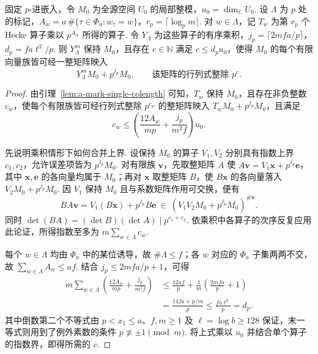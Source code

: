 \begin{lemma}
\label{lem:a-exceptional-hecke-colength}
\emitthmsource
固定 $p$-进嵌入，令 $M_0$ 为全源空间 $U_0$ 的局部整模，$u_0=\dim_{\mathbb C}U_0$. 设 $\Lambda$ 为 $p$ 处的标记，$A_w=a\,\#\{\tau\in\Phi_a:w_\tau=w\}$，$r_p=\lceil\log_p m\rceil$. 对 $w\in\Lambda$，记 $T_w$ 为第 $r_p$ 个 Hecke 算子乘以 $p^{A_w}$ 所得的算子. 令 $Y_\Lambda$ 为这些算子的有序乘积，$j_p=\lceil2mfa/p\rceil$，$d_p=fa\ell^2/p$. 则 $Y_\Lambda^m$ 保持 $M_0$，且存在 $c\in\mathbb N$ 满足 $c\le d_pu_0$，使得 $M_0$ 的每个有限向量族皆可经一整矩阵映入
\[
 Y_\Lambda^m M_0+p^{j_p}M_0,
 \qquad\text{该矩阵的行列式整除 }p^c.
\]
\end{lemma}
\begin{proof}
由引理~\ref{lem:a-mark-single-colength} 可知，$T_w$ 保持 $M_0$，且存在非负整数 $c_w$，使每个有限族皆可经行列式整除 $p^{c_w}$ 的整矩阵映入 $T_w M_0+p^{j_p}M_0$，且满足
\[
 c_w\le
  \left(\frac{12A_w}{mp}+\frac{j_p}{m^2f}\right)u_0 .
\]

先说明乘积情形下如何合并上界. 设保持 $M_0$ 的算子 $V_1,V_2$ 分别具有指数上界 $c_1,c_2$，允许误差项皆为 $p^{j_p}M_0$. 对有限族 $\boldsymbol v$，先取整矩阵 $A$ 使
$A\boldsymbol v=V_1\boldsymbol x+p^{j_p}\boldsymbol e$，其中 $\boldsymbol x,\boldsymbol e$ 的各向量均属于 $M_0$；再对 $\boldsymbol x$ 取整矩阵 $B$，使 $B\boldsymbol x$ 的各向量落入 $V_2M_0+p^{j_p}M_0$. 因 $V_1$ 保持 $M_0$ 且与系数矩阵作用可交换，便有
\[
 BA\boldsymbol v=V_1(B\boldsymbol x)+p^{j_p}B\boldsymbol e
    \ \in\ (V_1V_2M_0+p^{j_p}M_0)^{\#\boldsymbol v}.
\]
同时 $\det(BA)=(\det B)(\det A)\mid p^{c_1+c_2}$. 依乘积中各算子的次序反复应用此论证，所得指数至多为 $m\sum_{w\in\Lambda}c_w$.

每个 $w\in\Lambda$ 均由 $\Phi_a$ 中的某位诱导，故 $\#\Lambda\le f$；各 $w$ 对应的 $\Phi_a$ 子集两两不交，故 $\sum_{w\in\Lambda} A_w\le af$. 结合 $j_p\le 2mfa/p+1$，可得
\[
 \begin{aligned}
 m\sum_{w\in\Lambda}
       \left(\frac{12A_w}{mp}+\frac{j_p}{m^2f}\right)
 &\le \frac{12af}{p}+\frac{1}{m}\left(\frac{2mfa}{p}+1\right)\\
 &=\frac{14fa+p/m}{p}
 \le \frac{fa\ell^2}{p}
 =d_p .
 \end{aligned}
\]
其中倒数第二个不等式由 $p<x_1\le a$、$f,m\ge1$ 及 $\ell=\log b\ge128$ 保证，末一等式则用到了例外素数的条件 $p\not\equiv\pm1\pmod m$. 将上式乘以 $u_0$ 并结合单个算子的指数界，即得所需的 $c$.
\end{proof}

